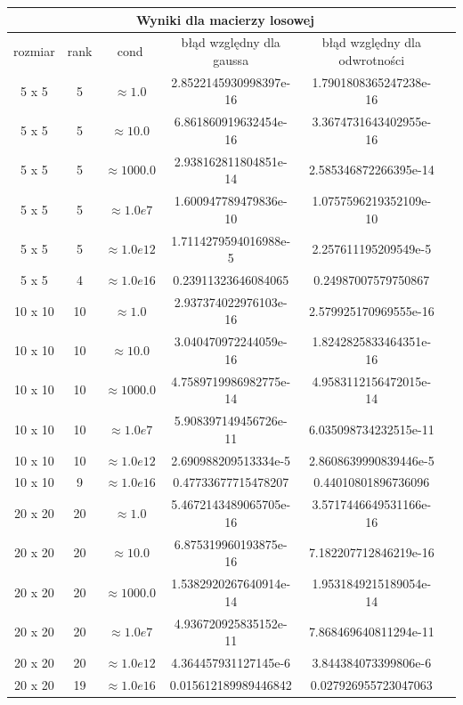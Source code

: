 \documentclass[]{article}
\begin{document}
	\begin{table}[h!]
		\centering
		\label{tab:table1}
		\begin{tabular}{|c|c|c|c|c|c|}
			\hline
			\multicolumn{5}{|c|}{Wyniki dla macierzy losowej} \\
			\hline
			rozmiar & rank & cond & błąd względny dla gaussa & błąd względny dla odwrotności \\ 
			\hline
5 x 5 & 5 & $\approx1.0$ & 2.8522145930998397e-16 & 1.7901808365247238e-16 \\ \hline
5 x 5 & 5 & $\approx10.0$ & 6.861860919632454e-16 & 3.3674731643402955e-16 \\ \hline
5 x 5 & 5 & $\approx1000.0$ & 2.938162811804851e-14 & 2.585346872266395e-14 \\ \hline
5 x 5 & 5 & $\approx1.0e7$ & 1.600947789479836e-10 & 1.0757596219352109e-10 \\ \hline
5 x 5 & 5 & $\approx1.0e12$ & 1.7114279594016988e-5 & 2.257611195209549e-5 \\ \hline
5 x 5 & 4 & $\approx1.0e16$ & 0.23911323646084065 & 0.24987007579750867 \\ \hline
10 x 10 & 10 & $\approx1.0$ & 2.937374022976103e-16 & 2.579925170969555e-16 \\ \hline
10 x 10 & 10 & $\approx10.0$ & 3.040470972244059e-16 & 1.8242825833464351e-16 \\ \hline
10 x 10 & 10 & $\approx1000.0$ & 4.7589719986982775e-14 & 4.9583112156472015e-14 \\ \hline
10 x 10 & 10 & $\approx1.0e7$ & 5.908397149456726e-11 & 6.035098734232515e-11 \\ \hline
10 x 10 & 10 & $\approx1.0e12$ & 2.690988209513334e-5 & 2.8608639990839446e-5 \\ \hline
10 x 10 & 9 & $\approx1.0e16$ & 0.47733677715478207 & 0.44010801896736096 \\ \hline
20 x 20 & 20 & $\approx1.0$ & 5.4672143489065705e-16 & 3.5717446649531166e-16 \\ \hline
20 x 20 & 20 & $\approx10.0$ & 6.875319960193875e-16 & 7.182207712846219e-16 \\ \hline
20 x 20 & 20 & $\approx1000.0$ & 1.5382920267640914e-14 & 1.9531849215189054e-14 \\ \hline
20 x 20 & 20 & $\approx1.0e7$ & 4.936720925835152e-11 & 7.868469640811294e-11 \\ \hline
20 x 20 & 20 & $\approx1.0e12$ & 4.364457931127145e-6 & 3.844384073399806e-6 \\ \hline
20 x 20 & 19 & $\approx1.0e16$ & 0.015612189989446842 & 0.027926955723047063 \\ \hline
		\end{tabular}
	\end{table}
\end{document}
